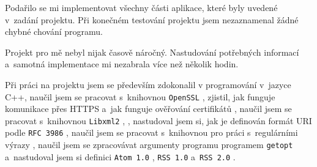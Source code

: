 \documentclass[a4paper, 11pt]{article}
\begin{document}
	Podařilo se mi implementovat všechny části aplikace, které byly uvedené
	v~zadání projektu. Při konečném testování projektu jsem nezaznamenal žádné
	chybné chování programu.

	Projekt pro mě nebyl nijak časově náročný. Nastudování potřebných informací
	a~samotná implementace mi nezabrala více než několik hodin.

	Při práci na projektu jsem se především zdokonalil v programování
	v~jazyce C++, naučil jsem se pracovat s~knihovnou \texttt{OpenSSL}
	\cite{openSSL}, zjistil, jak funguje komunikace přes HTTPS a~jak funguje
	ověřování certifikátů \cite{openSSL_tutorial}, naučil jsem se pracovat
	s~knihovnou \texttt{Libxml2} \cite{libxml}, \cite{libxml_tutorial},
	nastudoval jsem si, jak je definován formát URI podle \texttt{RFC 3986}
	\cite{url}, naučil jsem se pracovat s~knihovnou pro práci s~regulárními
	výrazy \cite{regex}, naučil jsem se zpracovávat argumenty programu
	programem \texttt{getopt} \cite{getopt} a~nastudoval jsem si definici
	\texttt{Atom 1.0} \cite{atom}, \texttt{RSS 1.0} \cite{rss1}
	a~\texttt{RSS 2.0} \cite{rss2}.



	\clearpage
	
	\renewcommand{\refname}{Literatura}
	
\end{document}
